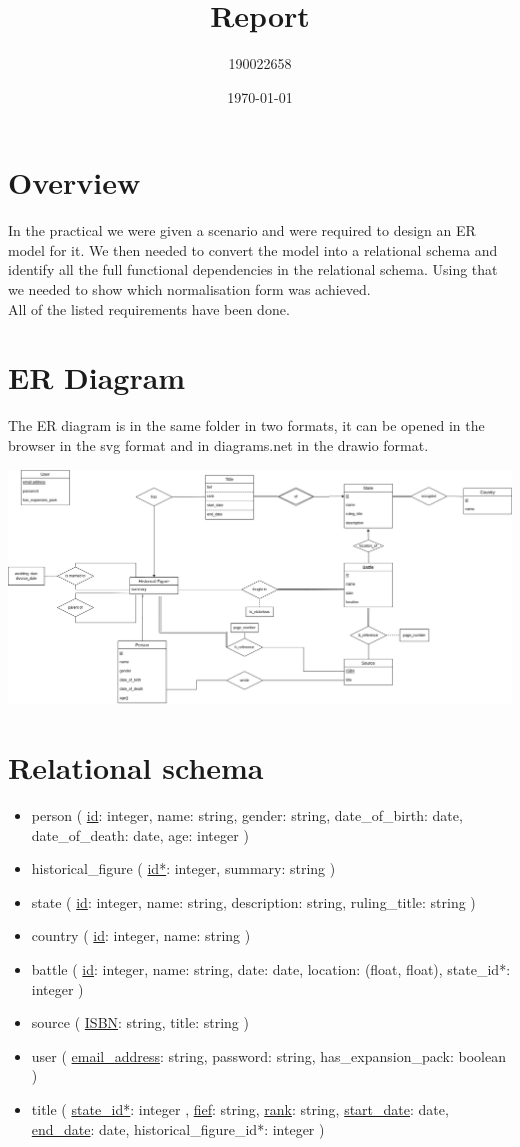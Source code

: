 \documentclass[11pt]{article}
\author{190022658}
\date{\today}
\title{Report}
\begin{document}
\maketitle

\section{Overview}
\label{sec:org38a2d65}
In the practical we were given a scenario and were required to design an ER model for it. We then needed to convert the model into a relational schema and identify all the full functional dependencies in the relational schema. Using that we needed to show which normalisation form was achieved.\\

All of the listed requirements have been done.
\section{ER Diagram}
\label{sec:org5ced7e5}
The ER diagram is in the same folder in two formats, it can be opened in the browser in the svg format and in diagrams.net in the drawio format.
\begin{center}
\includegraphics[width=.9\linewidth]{./er-diagram.drawio.png}
\end{center}
\section{Relational schema}
\label{sec:org2166e97}
\begin{itemize}
\item person ( \uline{id}: integer, name: string, gender: string, date\_of\_birth: date, date\_of\_death: date, age: integer )
\item historical\_figure ( \uline{id*}: integer, summary: string )
\item state ( \uline{id}: integer, name: string, description: string, ruling\_title: string )
\item country ( \uline{id}: integer, name: string )
\item battle ( \uline{id}: integer, name: string, date: date, location: (float, float), state\_id*: integer )
\item source ( \uline{ISBN}: string, title: string )
\item user ( \uline{email\_address}: string, password: string, has\_expansion\_pack: boolean )
\item title ( \uline{state\_id*}: integer , \uline{fief}: string, \uline{rank}: string, \uline{start\_date}: date, \uline{end\_date}: date, historical\_figure\_id*: integer )
\end{itemize}
\end{document}
